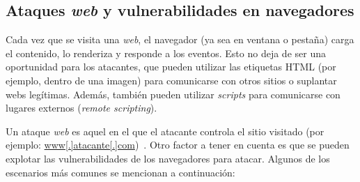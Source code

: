 \subsection{Ataques \textit{web} y vulnerabilidades en navegadores}

Cada vez que se visita una \textit{web}, el navegador (ya sea en ventana o pestaña) carga el contenido, lo renderiza y responde a los eventos. Esto no deja de ser una oportunidad para los atacantes, que pueden utilizar las etiquetas HTML (por ejemplo, dentro de una imagen) para comunicarse con otros sitios o suplantar webs legítimas. Además, también pueden utilizar \textit{scripts} para comunicarse con lugares externos (\textit{remote scripting}).

Un ataque \textit{web} es aquel en el que el atacante controla el sitio visitado (por ejemplo: \url{www[.]atacante[.]com})~\cite{apuntesCybersec}. Otro factor a tener en cuenta es que se pueden explotar las vulnerabilidades de los navegadores para atacar. Algunos de los escenarios más comunes se mencionan a continuación:

